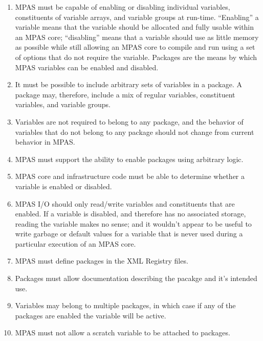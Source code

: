 \documentclass[11pt]{report}
\begin{document}
\begin{enumerate}

\item MPAS must be capable of enabling or disabling individual variables, 
   constituents of variable arrays, and variable groups at run-time.
   ``Enabling'' a variable means that the variable should be allocated and fully usable within
   an MPAS core; ``disabling'' means that a variable should use as little memory as possible 
   while still allowing an MPAS core to compile and run using a set of options that do not 
   require the variable. Packages are the means by which MPAS variables can be
   enabled and disabled.
   
\item It must be possible to include arbitrary sets of variables in a package. A package may, therefore,
   include a mix of regular variables, constituent variables, and variable groups. 

\item Variables are not required to belong to any package, and the behavior of variables that do
   not belong to any package should not change from current behavior in MPAS.
                                                                                                    
\item MPAS must support the ability to enable packages using arbitrary logic.

\item MPAS core and infrastructure code must be able to determine whether a variable is
   enabled or disabled.
   
\item MPAS I/O should only read/write variables and constituents that are enabled. If a variable
   is disabled, and therefore has no associated storage, reading the variable makes no sense; and
   it wouldn't appear to be useful to write garbage or default values for a variable that is never used
   during a particular execution of an MPAS core.

\item MPAS must define packages in the XML Registry files.

\item Packages must allow documentation describing the pacakge and it's intended use.

\item Variables may belong to multiple packages, in which case if any of the packages are enabled the variable will be active.

\item MPAS must not allow a scratch variable to be attached to packages.

\end{enumerate}                                                             
\end{document}
